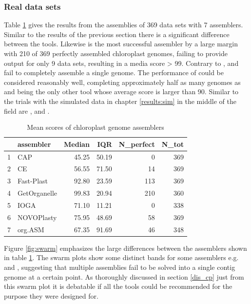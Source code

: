 \subsubsection{Real data sets}

Table \ref{tab:scores_real} gives the results from the assemblies of 369 data sets with 7 assemblers. Similar
to the results of the previous section there is a significant difference between the tools. Likewise \go is
the most successful assembler by a large margin with 210 of 369 perfectly assembled chloroplast genomes,
failing to provide output for only 9 data sets, resulting in a media score > 99.  Contrary to \go, \cassp and
\ioga fail to completely assemble a single genome. The performance of \fp could be considered reasonably well,
completing approximately half as many genomes as \go and being the only other tool whose average score is
larger than 90. Similar to the trials with the simulated data in chapter \ref{results:sim} in the middle of the field are \ce, \hspace{0.5ex} \np  \hspace{0.5ex} and \oa.


\begin{table}[H]
\caption{Mean scores of chloroplast genome assemblers}
\label{tab:scores_real}
\centering
\begin{tabular}{rlrrrr}
  \hline
  & assembler & Median & IQR & N\_perfect & N\_tot \\ 
  \hline
  1 & CAP & 45.25 & 50.19 &  0 & 369 \\ 
  2 & CE & 56.55 & 71.50 & 14 & 369 \\ 
  3 & Fast-Plast & 92.80 & 23.59 & 113 & 369 \\ 
  4 & GetOrganelle & 99.83 & 20.94 & 210 & 360 \\ 
  5 & IOGA & 71.10 & 11.21 & 0 & 338 \\ 
  6 & NOVOPlasty & 75.95 & 48.69 & 58 & 369 \\ 
  7 & org.ASM & 67.35 & 91.69 & 46 & 348 \\ 
  \hline
\end{tabular}
\end{table}


Figure \ref{fig:swarm} emphasizes the large differences between the assemblers shown in table
\ref{tab:scores_real}. The swarm plots show some distinct bands for some assemblers e.g. \np and \oa,
suggesting that multiple assemblies fail to be solved into a single contig genome at a certain point. As
thoroughly discussed in section \ref{dis_cp} just from this swarm plot it is debatable if all the tools could
be recommended for the purpose they were designed for.

